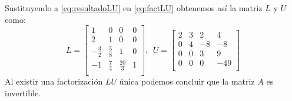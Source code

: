 \documentclass[12pt,titlepage]{article}
\begin{document}
\begin{enumerate}
\begin{equation}
\end{equation}
Sustituyendo a \eqref{eq:resultadoLU} en \eqref{eq:factLU} obtenemos así la matriz $L$ y $U$ como:
\begin{equation}
    L=\left[\begin{matrix}1&0&0&0\\2&1&0&0\\-\frac{3}{2}&\frac{5}{8}&1&0\\-1&\frac{7}{4}&\frac{20}{3}&1\\\end{matrix}\right],\ \ U=\left[\begin{matrix}2&3&2&4\\0&4&-8&-8\\0&0&3&9\\0&0&0&-49\\\end{matrix}\right]\nonumber
\end{equation}
Al existir una factorización $LU$ única podemos concluir que la matriz $A$ es invertible.


\end{enumerate}
\end{document}
